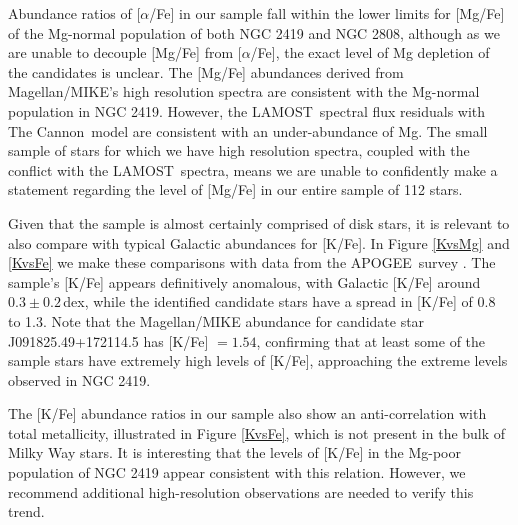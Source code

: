 \documentclass[a4paper,fleqn,usenatbib]{mnras}
\newcommand{\todo}[1]{\textcolor{red}{#1}}
\newcommand{\project}[1]{#1}
\newcommand{\lamost}{\project{LAMOST}}
\newcommand{\apogee}{\project{APOGEE}}
\newcommand{\tc}{\project{The Cannon}}
\begin{document}
Abundance ratios of [$\alpha$/Fe] in our sample fall within the lower limits for [Mg/Fe] of the Mg-normal population of both NGC 2419 and NGC 2808, although as we are unable to decouple [Mg/Fe] from $[\alpha$/Fe], the exact level of Mg depletion of the candidates is unclear. The [Mg/Fe] abundances derived from Magellan/MIKE's high resolution spectra are consistent with the Mg-normal population in NGC 2419. However, the \lamost\ spectral flux residuals with \tc\ model are consistent with an under-abundance of Mg. The small sample of stars for which we have high resolution spectra, coupled with the conflict with the \lamost\ spectra, means we are unable to confidently make a statement regarding the level of [Mg/Fe] in our entire sample of 112 stars.  

Given that the sample is almost certainly comprised of disk stars, it is relevant to also compare with typical Galactic abundances for [K/Fe]. In Figure \ref{KvsMg} and \ref{KvsFe} we make these comparisons with data from the \apogee\ survey \citep{alam2015}. The sample's [K/Fe] appears definitively anomalous, with Galactic [K/Fe] around $0.3 \pm 0.2$\,dex, while the identified candidate stars have a spread in [K/Fe] of 0.8 to 1.3. Note that the Magellan/MIKE abundance for candidate star J091825.49+172114.5 has [K/Fe] $=1.54$, confirming that at least some of the sample stars have extremely high levels of [K/Fe], approaching the extreme levels observed in NGC 2419.

The [K/Fe] abundance ratios in our sample also show an anti-correlation with total metallicity, illustrated in Figure \ref{KvsFe}, which is not present in the bulk of Milky Way stars. It is interesting that the levels of [K/Fe] in the Mg-poor population of NGC 2419 appear consistent with this relation. However, we recommend additional high-resolution observations are needed to verify this trend.



\end{document}
